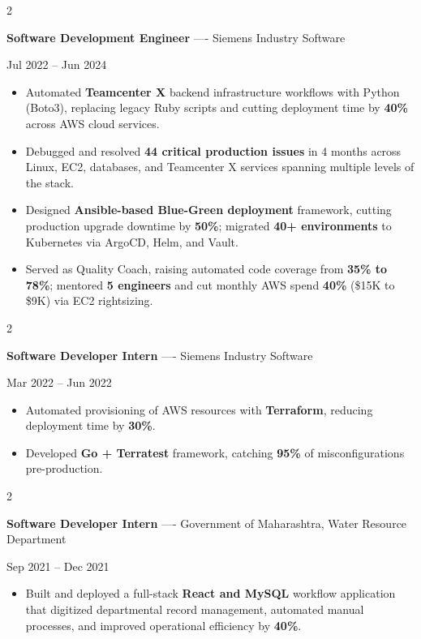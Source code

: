 \documentclass[10pt, letterpaper]{article}
\newenvironment{highlights}{
    \begin{itemize}[
        topsep=0.10 cm,
        parsep=0.06 cm,
        partopsep=0pt,
        itemsep=0.06 cm,
        leftmargin=12pt
    ]
}{
    \end{itemize}
}
\newenvironment{twocolentry}[2][]{
    \onecolentry
    \def\secondColumn{#2}
    \setcolumnwidth{\fill, 4.5 cm}
    \begin{paracol}{2}
}{
    \switchcolumn \raggedleft \secondColumn
    \end{paracol}
    \endonecolentry
}
\begin{document}
\begin{twocolentry}{Jul 2022 -- Jun 2024}
\textbf{Software Development Engineer} ---- Siemens Industry Software
\end{twocolentry}
\begin{highlights}
  \item Automated \textbf{Teamcenter X} backend infrastructure workflows with Python (Boto3), replacing legacy Ruby scripts and cutting deployment time by \textbf{40\%} across AWS cloud services.
  \item Debugged and resolved \textbf{44 critical production issues} in 4 months across Linux, EC2, databases, and Teamcenter X services spanning multiple levels of the stack.
  \item Designed \textbf{Ansible-based Blue-Green deployment} framework, cutting production upgrade downtime by \textbf{50\%}; migrated \textbf{40+ environments} to Kubernetes via ArgoCD, Helm, and Vault.
  \item Served as Quality Coach, raising automated code coverage from \textbf{35\% to 78\%}; mentored \textbf{5 engineers} and cut monthly AWS spend \textbf{40\%} (\$15K to \$9K) via EC2 rightsizing.
\end{highlights}

\vspace{0.15 cm}

\begin{twocolentry}{Mar 2022 -- Jun 2022}
\textbf{Software Developer Intern} ---- Siemens Industry Software
\end{twocolentry}
\begin{highlights}
  \item Automated provisioning of AWS resources with \textbf{Terraform}, reducing deployment time by \textbf{30\%}.
  \item Developed \textbf{Go + Terratest} framework, catching \textbf{95\%} of misconfigurations pre-production.
\end{highlights}

\vspace{0.15 cm}

\begin{twocolentry}{Sep 2021 -- Dec 2021}
\textbf{Software Developer Intern} ---- Government of Maharashtra, Water Resource Department
\end{twocolentry}
\begin{highlights}
  \item Built and deployed a full-stack \textbf{React and MySQL} workflow application that digitized departmental record management, automated manual processes, and improved operational efficiency by \textbf{40\%}.
\end{highlights}
\end{document}
